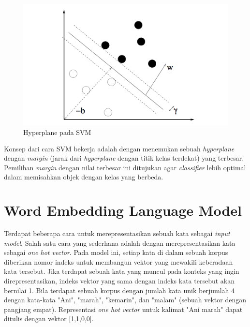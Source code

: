 \begin{figure}
	\centering
	\includegraphics[width=1\linewidth]{adit_pics/svm-hyperplane}
	\caption{Hyperplane pada SVM \citep{fradkin2006support}}
	\label{fig:svm}
\end{figure}

Konsep dari cara SVM bekerja adalah dengan menemukan sebuah \textit{hyperplane} dengan \textit{margin} (jarak dari \textit{hyperplane} dengan titik kelas terdekat) yang terbesar. Pemilihan \textit{margin} dengan nilai terbesar ini ditujukan agar \textit{classifier} lebih optimal dalam memisahkan objek dengan kelas yang berbeda.

\section{Word Embedding Language Model}
Terdapat beberapa cara untuk merepresentasikan sebuah kata sebagai \textit{input model}. Salah satu cara yang sederhana adalah dengan merepresentasikan kata sebagai \textit{one hot vector}. Pada model ini, setiap kata di dalam sebuah korpus diberikan nomor indeks untuk membangun vektor yang mewakili keberadaan kata tersebut. Jika terdapat sebuah kata yang muncul pada konteks yang ingin direpresentasikan, indeks vektor yang sama dengan indeks kata tersebut akan bernilai 1. Bila terdapat sebuah korpus dengan jumlah kata unik berjumlah 4 dengan kata-kata "Ani", "marah", "kemarin", dan "malam" (sebuah vektor dengan pangjang empat). Representasi \textit{one hot vector} untuk kalimat "Ani marah" dapat ditulis dengan vektor [1,1,0,0].

